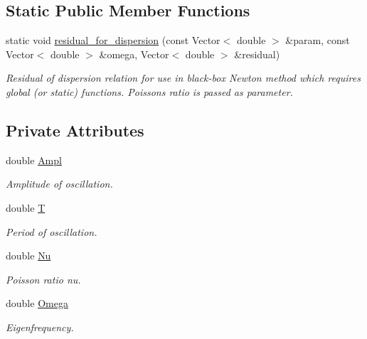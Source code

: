 \subsection*{Static Public Member Functions}
\begin{DoxyCompactItemize}
\item 
static void \hyperlink{classAxisymOscillatingDisk_ae6a90b479781b587bb8905e7bf2bba3b}{residual\+\_\+for\+\_\+dispersion} (const Vector$<$ double $>$ \&param, const Vector$<$ double $>$ \&omega, Vector$<$ double $>$ \&residual)
\begin{DoxyCompactList}\small\item\em Residual of dispersion relation for use in black-\/box Newton method which requires global (or static) functions. Poisson\textquotesingle{}s ratio is passed as parameter. \end{DoxyCompactList}\end{DoxyCompactItemize}
\subsection*{Private Attributes}
\begin{DoxyCompactItemize}
\item 
double \hyperlink{classAxisymOscillatingDisk_a9b73de59d11877c96bc85ad52fe7c407}{Ampl}
\begin{DoxyCompactList}\small\item\em Amplitude of oscillation. \end{DoxyCompactList}\item 
double \hyperlink{classAxisymOscillatingDisk_a7789dcf51ef2e2eb6e5eaa826f404da1}{T}
\begin{DoxyCompactList}\small\item\em Period of oscillation. \end{DoxyCompactList}\item 
double \hyperlink{classAxisymOscillatingDisk_abe977725f5fc04c5bfa8466ecdef0956}{Nu}
\begin{DoxyCompactList}\small\item\em Poisson ratio nu. \end{DoxyCompactList}\item 
double \hyperlink{classAxisymOscillatingDisk_ab0ae3a1a7324dd0ccce15fd84471e3d1}{Omega}
\begin{DoxyCompactList}\small\item\em Eigenfrequency. \end{DoxyCompactList}\end{DoxyCompactItemize}


